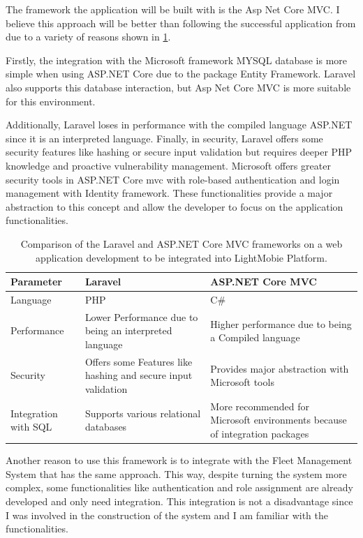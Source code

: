The framework the application will be built with is the Asp Net Core MVC. 
I believe this approach will be better than following the successful application from \citet{MAS_MOTORS} due to a variety of reasons shown in \ref{table:architetcture_comparison}.

Firstly, the integration with the Microsoft framework MYSQL database is more simple when using \ac{ASP.NET} Core due to the package Entity Framework. %
Laravel also supports this database interaction, but Asp Net Core MVC is more suitable for this environment. ~\cite{asp_net_vs_laravel}

Additionally, Laravel loses in performance with the compiled language \ac{ASP.NET} since it is an interpreted language. 
Finally, in security, Laravel offers some security features like hashing or secure input validation but requires deeper PHP knowledge and proactive vulnerability management. 
Microsoft offers greater security tools in \ac{ASP.NET} Core mvc with role-based authentication and login management with Identity framework.
These functionalities provide a major abstraction to this concept and allow the developer to focus on the application functionalities. ~\cite{asp_net_vs_laravel}


\begin{table}[]
    \begin{tabular}{| m{5em} | m{15em} | m{15em} |}
      \hline
   Parameter & Laravel  & \ac{ASP.NET} Core MVC   \\
     \hline
   Language & PHP & C\#  \\
     \hline
   Performance & Lower Performance due to being an interpreted language & Higher performance due to being a Compiled language   \\
     \hline
   Security & Offers some Features like hashing and secure input validation & Provides major abstraction with Microsoft tools   \\
     \hline
   Integration with SQL & Supports various relational databases & More recommended for Microsoft environments because of integration packages  \\
     \hline
  \end{tabular}
    \caption{Comparison of the Laravel and \ac{ASP.NET} Core MVC frameworks on a web application development to be integrated into LightMobie Platform.}
    \label{table:architetcture_comparison}
    \end{table}

  Another reason to use this framework is to integrate with the Fleet Management System that has the same approach. 
  This way, despite turning the system more complex, some functionalities like authentication and role assignment are already developed and only need integration. 
  This integration is not a disadvantage since I was involved in the construction of the system and I am familiar with the functionalities.
  
  



